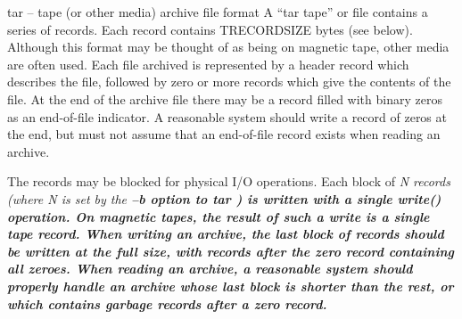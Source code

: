 


%
%

tar -- tape (or other media) archive file format
A ``tar tape'' or file contains a series of records.  Each record contains
TRECORDSIZE bytes (see below).  Although this format may be thought of as
being on magnetic tape, other media are often used.
Each file archived is represented by a header record
which describes the file, followed by zero or more records which give the
contents of the file.  At the end of the archive file there may be a record
filled with binary zeros as an end-of-file indicator.  A reasonable
system should write a record of zeros at the end, but must not assume that
an end-of-file record exists when reading an archive.

The records may be blocked for physical I/O operations.  Each block of
%
\it N \rm%
 records (where %
\it N \rm%
 is set by the %
\bf --b \rm%
 option to %
\it tar\rm%
)
is written with a single write() operation.  On
magnetic tapes, the result of such a write is a single tape record.
When writing an archive, the last block of records should be written
at the full size, with records after the zero record containing
all zeroes.  When reading an archive, a reasonable system should
properly handle an archive whose last block is shorter than the rest, or
which contains garbage records after a zero record.

